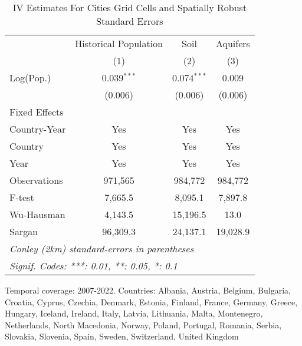 
\begin{table}[htbp]
   \caption{\label{tab:within_lez_iv_all_conley} IV Estimates For Cities Grid Cells and Spatially Robust Standard Errors}
   \centering
   \small
   \begin{tabular}{lccc}
      \tabularnewline \midrule \midrule
                   & Historical Population & Soil          & Aquifers \\   
                   & (1)                   & (2)           & (3)\\  
      Log(Pop.)    & 0.039$^{***}$         & 0.074$^{***}$ & 0.009\\   
                   & (0.006)               & (0.006)       & (0.006)\\   
      Fixed Effects\\
      Country-Year & Yes                   & Yes           & Yes\\  
      Country      & Yes                   & Yes           & Yes\\  
      Year         & Yes                   & Yes           & Yes\\  
      \midrule 
      Observations & 971,565               & 984,772       & 984,772\\  
      F-test       & 7,665.5               & 8,095.1       & 7,897.8\\  
      Wu-Hausman   & 4,143.5               & 15,196.5      & 13.0\\  
      Sargan       & 96,309.3              & 24,137.1      & 19,028.9\\  
      \midrule \midrule
      \multicolumn{4}{l}{\emph{Conley (2km) standard-errors in parentheses}}\\
      \multicolumn{4}{l}{\emph{Signif. Codes: ***: 0.01, **: 0.05, *: 0.1}}\\
   \end{tabular}
   
   \par \raggedright 
   Temporal coverage: 2007-2022. Countries: Albania, Austria, Belgium, Bulgaria, Croatia, Cyprus, Czechia, Denmark, Estonia, Finland, France, Germany, Greece, Hungary, Iceland, Ireland, Italy, Latvia, Lithuania, Malta, Montenegro, Netherlands, North Macedonia, Norway, Poland, Portugal, Romania, Serbia, Slovakia, Slovenia, Spain, Sweden, Switzerland, United Kingdom
\end{table}


